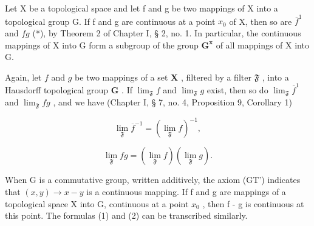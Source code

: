 Let X be a topological space and let f and g be two mappings of X into a topological group G. If f and g are continuous at a point \(x_{0}\) of X, then so are \(\overline{f}^{1}\) and \(fg\) (*), by Theorem 2 of Chapter I, § 2, no. 1. In particular, the continuous mappings of X into G form a subgroup of the group \(\mathbf{G}^{\mathbf{x}}\) of all mappings of X into G.

Again, let \(f\) and \(g\) be two mappings of a set \(\mathbf{X}\) , filtered by a filter \(\mathfrak{F}\) , into a Hausdorff topological group \(\mathbf{G}\) . If \(\lim_{\mathfrak{F}} f\) and \(\lim_{\mathfrak{F}} g\) exist, then so do \(\lim_{\mathfrak{F}} \overline{f}^1\) and \(\lim_{\mathfrak{F}} fg\) , and we have (Chapter I, § 7, no. 4, Proposition 9, Corollary 1)

\[
\lim _ {\mathfrak {F}} \overline {{f}} ^ {- 1} = (\lim _ {\mathfrak {F}} f) ^ {- 1},\tag{1}
\]

\[
\lim _ {\mathfrak {F}} f g = (\lim _ {\mathfrak {F}} f) (\lim _ {\mathfrak {F}} g).\tag{2}
\]

When G is a commutative group, written additively, the axiom (GT') indicates that \((x, y) \to x - y\) is a continuous mapping. If f and g are mappings of a topological space X into G, continuous at a point \(x_{0}\) , then f - g is continuous at this point. The formulas (1) and (2) can be transcribed similarly.
\relax{}
